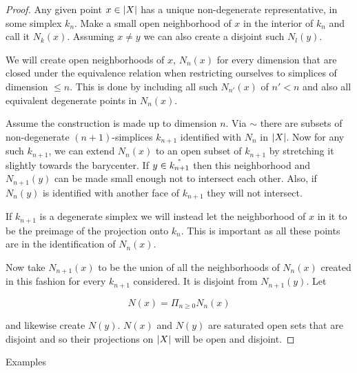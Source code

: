 \documentclass[../../main.tex]{subfiles}
\begin{document}
    \begin{proof}
        Any given point $x \in \geom[X]$ has a unique non-degenerate representative, in some simplex $k_n$. Make a small open neighborhood of $x$ in the interior of $k_n$ and call it $N_k(x)$. Assuming $x \neq y$ we can also create a disjoint such $N_l(y)$.
        
        We will create open neighborhoods of $x$, $N_n(x)$ for every dimension that are closed under the equivalence relation when restricting ourselves to simplices of dimension $\leq n$. This is done by including all such $N_{n'}(x)$ of $n' < n$ and also all equivalent degenerate points in $N_n(x)$.
        
        Assume the construction is made up to dimension $n$. Via $\sim$ there are subsets of non-degenerate $(n+1)$-simplices $k_{n+1}$ identified with $N_n$ in $\geom[X]$. Now for any such $k_{n+1}$, we can extend $N_n(x)$ to an open subset of $k_{n+1}$ by stretching it slightly towards the barycenter. If $y \in \interior{k_{n+1}}$ then this neighborhood and $N_{n+1}(y)$ can be made small enough not to intersect each other. Also, if $N_{n}(y)$ is identified with another face of $k_{n+1}$ they will not intersect.

        If $k_{n+1}$ is a degenerate simplex we will instead let the neighborhood of $x$ in it to be the preimage of the projection onto $k_n$. This is important as all these points are in the identification of $N_n(x)$.

        Now take $N_{n+1}(x)$ to be the union of all the neighborhoods of $N_n(x)$ created in this fashion for every $k_{n+1}$ considered. It is disjoint from $N_{n+1}(y)$. Let

        \begin{equation*}
            N(x) = \Pi_{n \geq 0} N_n(x)
        \end{equation*}

        and likewise create $N(y)$. $N(x)$ and $N(y)$ are saturated open sets that are disjoint and so their projections on $\geom[X]$ will be open and disjoint.
    \end{proof}
    
    Examples
\end{document}

